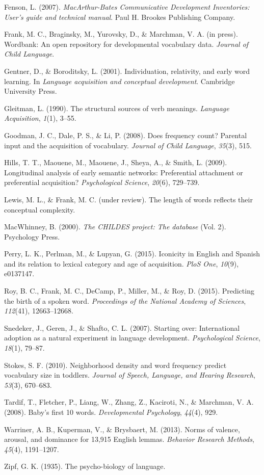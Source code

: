 \documentclass[10pt, letterpaper]{article}
\begin{document}
Fenson, L. (2007). \emph{MacArthur-Bates Communicative Development
Inventories: User's guide and technical manual}. Paul H. Brookes
Publishing Company.

Frank, M. C., Braginsky, M., Yurovsky, D., \& Marchman, V. A. (in
press). Wordbank: An open repository for developmental vocabulary data.
\emph{Journal of Child Language}.

Gentner, D., \& Boroditsky, L. (2001). Individuation, relativity, and
early word learning. In \emph{Language acquisition and conceptual
development}. Cambridge University Press.

Gleitman, L. (1990). The structural sources of verb meanings.
\emph{Language Acquisition}, \emph{1}(1), 3--55.

Goodman, J. C., Dale, P. S., \& Li, P. (2008). Does frequency count?
Parental input and the acquisition of vocabulary. \emph{Journal of Child
Language}, \emph{35}(3), 515.

Hills, T. T., Maouene, M., Maouene, J., Sheya, A., \& Smith, L. (2009).
Longitudinal analysis of early semantic networks: Preferential
attachment or preferential acquisition? \emph{Psychological Science},
\emph{20}(6), 729--739.

Lewis, M. L., \& Frank, M. C. (under review). The length of words
reflects their conceptual complexity.

MacWhinney, B. (2000). \emph{The CHILDES project: The database} (Vol.
2). Psychology Press.

Perry, L. K., Perlman, M., \& Lupyan, G. (2015). Iconicity in English
and Spanish and its relation to lexical category and age of acquisition.
\emph{PloS One}, \emph{10}(9), e0137147.

Roy, B. C., Frank, M. C., DeCamp, P., Miller, M., \& Roy, D. (2015).
Predicting the birth of a spoken word. \emph{Proceedings of the National
Academy of Sciences}, \emph{112}(41), 12663--12668.

Snedeker, J., Geren, J., \& Shafto, C. L. (2007). Starting over:
International adoption as a natural experiment in language development.
\emph{Psychological Science}, \emph{18}(1), 79--87.

Stokes, S. F. (2010). Neighborhood density and word frequency predict
vocabulary size in toddlers. \emph{Journal of Speech, Language, and
Hearing Research}, \emph{53}(3), 670--683.

Tardif, T., Fletcher, P., Liang, W., Zhang, Z., Kaciroti, N., \&
Marchman, V. A. (2008). Baby's first 10 words. \emph{Developmental
Psychology}, \emph{44}(4), 929.

Warriner, A. B., Kuperman, V., \& Brysbaert, M. (2013). Norms of
valence, arousal, and dominance for 13,915 English lemmas.
\emph{Behavior Research Methods}, \emph{45}(4), 1191--1207.

Zipf, G. K. (1935). The psycho-biology of language.
\end{document}
